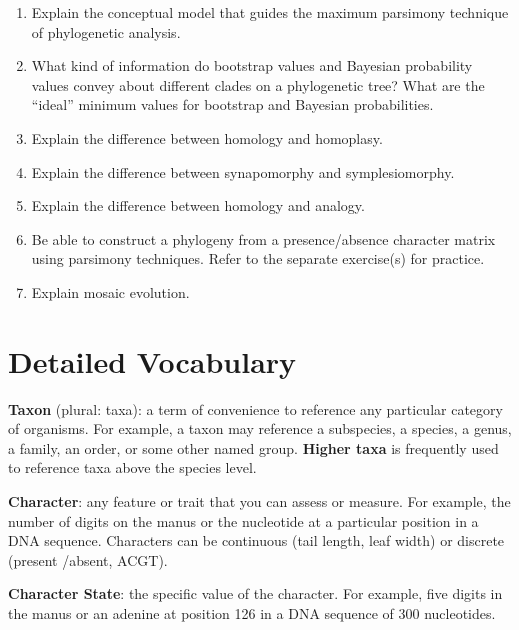 \documentclass[letterpaper]{tufte-handout}
\begin{document}
\begin{enumerate}
	
	\item Explain the conceptual model that guides the maximum parsimony technique of phylogenetic analysis.

	\item What kind of information do bootstrap values and Bayesian probability values convey about different clades on a phylogenetic tree?  What are the ``ideal'' minimum values for bootstrap and Bayesian probabilities.
	
	\item Explain the difference between homology and homoplasy.
	
	\item Explain the difference between synapomorphy and symplesiomorphy.
	
	\item Explain the difference between homology and analogy.
	
	\item Be able to construct a phylogeny from a presence/absence character matrix using parsimony techniques. Refer to the separate exercise(s) for practice.
	
	\item Explain mosaic evolution.	

\end{enumerate}

\section{Detailed Vocabulary}

\textbf{Taxon} (plural: taxa): a term of convenience to reference any particular category of organisms. For example, a taxon may reference a subspecies, a species, a genus, a family, an order, or some other named group. \textbf{Higher taxa} is frequently used to reference taxa above the species level.

\textbf{Character}: any feature or trait that you can assess or measure.  For example, the number of digits on the manus or the nucleotide at a particular position in a DNA sequence.  Characters can be continuous (tail length, leaf width) or discrete (present /absent, ACGT).

\textbf{Character State}: the specific value of the character. For example, five digits in the manus or an adenine at position 126 in a DNA sequence of 300 nucleotides. 
\end{document}
